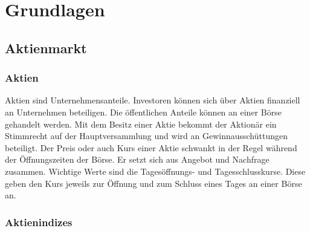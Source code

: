 \section{Grundlagen}

\subsection{Aktienmarkt}

\subsubsection{Aktien}


Aktien sind Unternehmensanteile. Investoren können sich über Aktien finanziell an Unternehmen beteiligen. Die öffentlichen Anteile können an einer Börse gehandelt werden. Mit dem Besitz einer Aktie bekommt der Aktionär ein Stimmrecht auf der Hauptversammlung und wird an Gewinnausschüttungen beteiligt. Der Preis oder auch Kurs einer Aktie schwankt in der Regel während der Öffnungszeiten der Börse. Er setzt sich aus Angebot und Nachfrage zusammen. Wichtige Werte sind die Tagesöffnungs- und Tagesschlusskurse. Diese geben den Kurs jeweils zur Öffnung und zum Schluss eines Tages an einer Börse an.

\subsubsection{Aktienindizes}

